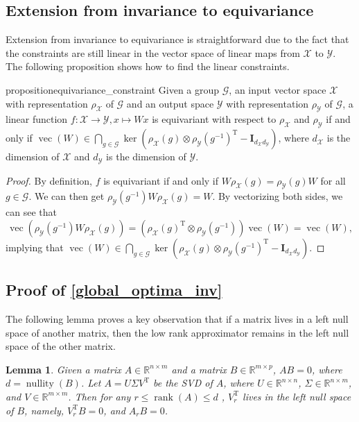 \documentclass{article}
\newcommand{\T}{\mathrm{T}}
\newcommand{\G}{\mathcal{G}}
\newcommand{\X}{\mathcal{X}}
\newcommand{\Y}{\mathcal{Y}}
\theoremstyle{plain}
\newtheorem{lemma}[theorem]{Lemma}
\theoremstyle{definition}
\theoremstyle{remark}
\theoremstyle{remark}
\begin{document}
\subsection{Extension from invariance to equivariance} \label{app:equivariance}

Extension from invariance to equivariance is straightforward due to the fact that the constraints are still linear in the vector space of linear maps from $\X$ to $\Y$. The following proposition shows how to find the linear constraints.

\begin{restatable}{proposition}{equivariance_constraint}
  \label{equivariance_constraint}
  Given a group $\mathcal{G}$, an input vector space $\X$ with representation $\rho_{\X}$  of $\G$ and an output space $\Y$ with representation $\rho_{\Y}$ of $\G$, a linear function $f: \X \rightarrow \Y, x \mapsto Wx$ is equivariant with respect to $\rho_{\X}$ and $\rho_{\Y}$ if and only if $\operatorname*{vec}(W) \in \bigcap_{g \in \G} \ker \left({\rho_{\X}(g) \otimes {\rho_{\Y}(g^{-1})}}^{\T} - \mathbf{I}_{d_{\X}d_{\Y}}\right)$, where $d_{\X}$ is the dimension of $\X$ and $d_{\Y}$ is the dimension of $\Y$.
\end{restatable}

\begin{proof}
    By definition, $f$ is equivariant if and only if $W \rho_{\X}(g) = \rho_{\Y}(g) W$ for all $g \in \G$. We can then get $\rho_{\Y}(g^{-1}) W \rho_{\X}(g) = W$. By vectorizing both sides, we can see that 
    $$\operatorname*{vec}(\rho_{\Y}(g^{-1}) W \rho_{\X}(g)) = \left({\rho_{\X}(g)}^{\T} \otimes \rho_{\Y}(g^{-1})\right) \operatorname*{vec}(W) = \operatorname*{vec}(W),$$ 
    implying that $\operatorname*{vec}(W) \in \bigcap_{g \in \G} \ker \left({\rho_{\X}(g) \otimes {\rho_{\Y}(g^{-1})}}^{\T} - \mathbf{I}_{d_{\X}d_{\Y}}\right)$.
\end{proof}

\subsection{Proof of \autoref{global_optima_inv}} \label{app:proof-thm1}
  The following lemma proves a key observation that if a matrix lives in a left null space of another matrix, then the low rank approximator remains in the left null space of the other matrix. 
  \begin{lemma} \label{lemma:left_null_svd}
    Given a matrix $A \in \mathbb{R}^{n\times m}$ and a matrix $B \in \mathbb{R}^{m \times p}$, $AB = 0$, where $d = \operatorname*{nullity}(B)$. Let $A = U\Sigma V^{\T}$ be the SVD of $A$, where $U \in \mathbb{R}^{n \times n}$, $\Sigma \in \mathbb{R}^{n \times m}$, and $V \in \mathbb{R}^{m \times m}$. Then for any $r \leq \operatorname*{rank}(A) \leq d$ , $V_r^{\T}$ lives in the left null space of $B$, namely, $V_r^{\T} B = 0$, and $A_r B = 0$.
  \end{lemma}
\end{document}
